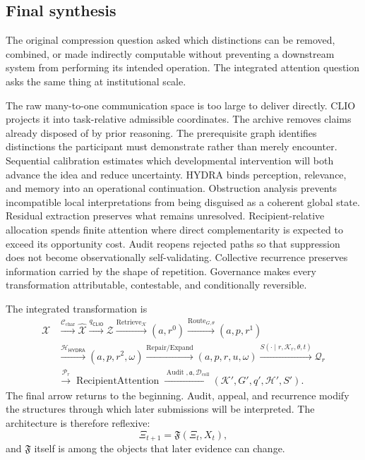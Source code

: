 \documentclass[11pt]{article}
\theoremstyle{definition}
\DeclareMathOperator{\Audit}{Audit}
\newcommand{\K}{\mathcal{K}}
\newcommand{\CLIO}{\mathsf{CLIO}}
\newcommand{\HYDRA}{\mathsf{HYDRA}}
\begin{document}
\subsection{Final synthesis}

The original compression question asked which distinctions can be removed, combined, or made indirectly computable without preventing a downstream system from performing its intended operation. The integrated attention question asks the same thing at institutional scale.

The raw many-to-one communication space is too large to deliver directly. CLIO projects it into task-relative admissible coordinates. The archive removes claims already disposed of by prior reasoning. The prerequisite graph identifies distinctions the participant must demonstrate rather than merely encounter. Sequential calibration estimates which developmental intervention will both advance the idea and reduce uncertainty. HYDRA binds perception, relevance, and memory into an operational continuation. Obstruction analysis prevents incompatible local interpretations from being disguised as a coherent global state. Residual extraction preserves what remains unresolved. Recipient-relative allocation spends finite attention where direct complementarity is expected to exceed its opportunity cost. Audit reopens rejected paths so that suppression does not become observationally self-validating. Collective recurrence preserves information carried by the shape of repetition. Governance makes every transformation attributable, contestable, and conditionally reversible.

The integrated transformation is
\[
\begin{aligned}
\mathcal{X}
&\xrightarrow{\mathcal{C}_{\mathrm{char}}}
\widehat{\mathcal{X}}
\xrightarrow{q_{\CLIO}}
\mathcal{Z}
\xrightarrow{\operatorname{Retrieve}_{\K}}
(a,r^{0})
\xrightarrow{\operatorname{Route}_{G,\theta}}
(a,p,r^{1})
\\
&\xrightarrow{\mathcal{H}_{\HYDRA}}
(a,p,r^{2},\omega)
\xrightarrow{\operatorname{Repair/Expand}}
(a,p,r,u,\omega)
\xrightarrow{S(\cdot\mid r,\K_r,\theta,t)}
\mathcal{Q}_r
\\
&\xrightarrow{\mathcal{P}_r}
\operatorname{RecipientAttention}
\xrightarrow{\Audit,\mathfrak{a},\mathcal{D}_{\mathrm{coll}}}
(\K',G',q',\mathcal{H}',S').
\end{aligned}
\]
The final arrow returns to the beginning. Audit, appeal, and recurrence modify the structures through which later submissions will be interpreted. The architecture is therefore reflexive:
\[
\Xi_{t+1}
=
\mathfrak{F}(\Xi_t,X_t),
\]
and \(\mathfrak{F}\) itself is among the objects that later evidence can change.
\end{document}
